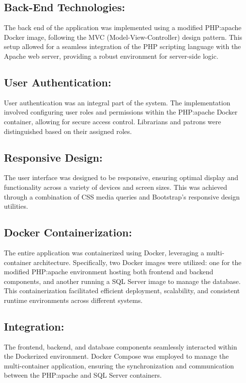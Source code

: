 \documentclass[12pt,titlepage,a4paper]{report}
\begin{document}
\subsection{Back-End Technologies:}
\noindent
The back end of the application was implemented using a modified PHP:apache Docker image, following the MVC (Model-View-Controller) design pattern. This setup allowed for a seamless integration of the PHP scripting language with the Apache web server, providing a robust environment for server-side logic.

\subsection{User Authentication:}
\noindent
User authentication was an integral part of the system. The implementation involved configuring user roles and permissions within the PHP:apache Docker container, allowing for secure access control. Librarians and patrons were distinguished based on their assigned roles.

\subsection{Responsive Design:}
\noindent
The user interface was designed to be responsive, ensuring optimal display and functionality across a variety of devices and screen sizes. This was achieved through a combination of CSS media queries and Bootstrap's responsive design utilities.

\subsection{Docker Containerization:}
\noindent
The entire application was containerized using Docker, leveraging a multi-container architecture. Specifically, two Docker images were utilized: one for the modified PHP:apache environment hosting both frontend and backend components, and another running a SQL Server image to manage the database. This containerization facilitated efficient deployment, scalability, and consistent runtime environments across different systems.

\subsection{Integration:}
\noindent
The frontend, backend, and database components seamlessly interacted within the Dockerized environment. Docker Compose was employed to manage the multi-container application, ensuring the synchronization and communication between the PHP:apache and SQL Server containers.
\end{document}

